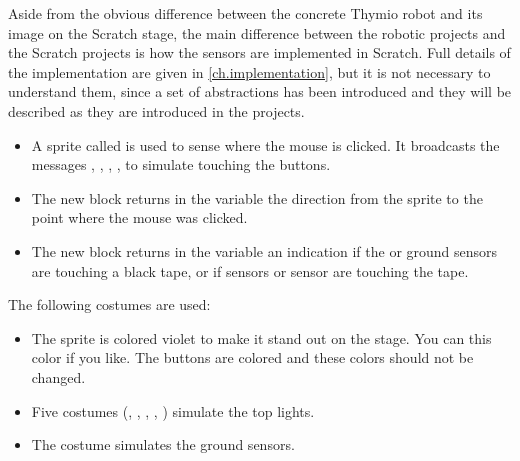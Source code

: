 
Aside from the obvious difference between the concrete Thymio robot and
its image on the Scratch stage, the main difference between the robotic
projects and the Scratch projects is how the sensors are implemented in
Scratch. Full details of the implementation are given in
\cref{ch.implementation}, but it is not necessary to understand them,
since a set of abstractions has been introduced and they will be
described as they are introduced in the projects.

\begin{itemize}

\item A sprite called  is used to sense where the mouse is
clicked. It broadcasts the messages , , ,
,  to simulate touching the buttons.

\item The new block  returns in the
variable  the direction from the
 sprite to the point where the mouse was clicked.

\item The new block  returns in the variable
 an indication if the  or  ground
sensors are touching a black tape, or if  sensors or 
sensor are touching the tape.

\end{itemize}

The following costumes are used:

\begin{itemize}

\item The  sprite is colored violet to make it stand out on the
stage. You can this color if you like. The buttons are colored and these
colors should not be changed.

\item Five costumes (, , , ,
) simulate the top lights.

\item The costume  simulates the ground sensors.

\end{itemize}
